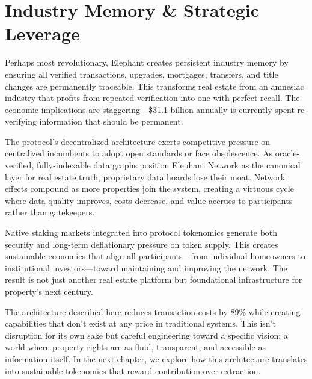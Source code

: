 \section{Industry Memory \& Strategic Leverage}

Perhaps most revolutionary, Elephant creates persistent industry memory by ensuring all verified transactions, upgrades, mortgages, transfers, and title changes are permanently traceable. This transforms real estate from an amnesiac industry that profits from repeated verification into one with perfect recall. The economic implications are staggering—\$31.1 billion annually is currently spent re-verifying information that should be permanent.

The protocol's decentralized architecture exerts competitive pressure on centralized incumbents to adopt open standards or face obsolescence. As oracle-verified, fully-indexable data graphs position Elephant Network as the canonical layer for real estate truth, proprietary data hoards lose their moat. Network effects compound as more properties join the system, creating a virtuous cycle where data quality improves, costs decrease, and value accrues to participants rather than gatekeepers.

Native staking markets integrated into protocol tokenomics generate both security and long-term deflationary pressure on token supply. This creates sustainable economics that align all participants—from individual homeowners to institutional investors—toward maintaining and improving the network. The result is not just another real estate platform but foundational infrastructure for property's next century.

The architecture described here reduces transaction costs by 89\% while creating capabilities that don't exist at any price in traditional systems. This isn't disruption for its own sake but careful engineering toward a specific vision: a world where property rights are as fluid, transparent, and accessible as information itself. In the next chapter, we explore how this architecture translates into sustainable tokenomics that reward contribution over extraction.